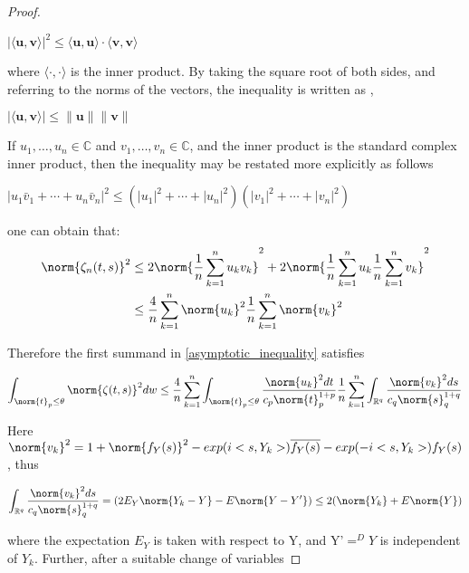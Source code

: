 \begin{proof}
\begin{prop}
$|\langle \mathbf {u} ,\mathbf {v} \rangle |^{2}\leq \langle \mathbf {u} ,\mathbf {u} \rangle \cdot \langle \mathbf {v} ,\mathbf {v} \rangle $

where $ \langle \cdot ,\cdot \rangle $ is the inner product. By taking the square root of both sides, and referring to the norms of the vectors, the inequality is written as \cite{C-S-B_inequality1}, \cite{C-S-B_inequality2}

$ |\langle \mathbf {u} ,\mathbf {v} \rangle |\leq \|\mathbf {u} \|\|\mathbf {v} \|$

If $ u_{1},\ldots ,u_{n}\in \mathbb {C} $ and $ v_{1},\ldots ,v_{n}\in \mathbb {C} $, and the inner product is the standard complex inner product, then the inequality may be restated more explicitly as follows 

$ |u_{1}{\bar {v}}_{1}+\cdots +u_{n}{\bar {v}}_{n}|^{2}\leq (|u_{1}|^{2}+\cdots +|u_{n}|^{2})(|v_{1}|^{2}+\cdots +|v_{n}|^{2})$

\end{prop} 

one can obtain that:
\begin{equation}{}
\begin{split}
\norm{\zeta_{n}(t,s)}^{2}&
\leq 2 \norm{\frac{1}{n}\sum_{k=1}^{n}u_{k}v_{k}}^{2} + 2\norm{\frac{1}{n}\sum_{k=1}^{n}u_{k}\frac{1}{n}\sum_{k=1}^{n}v_{k}}^{2} \\
&\leq \frac{4}{n}\sum_{k=1}^{n}\norm{u_{k}}^{2}\frac{1}{n}\sum_{k=1}^{n}\norm{v_{k}}^{2}
\end{split}
\end{equation}\label{eq_conaaazo}

Therefore the first summand in \ref{asymptotic_inequality} satisfies

$$
\int_{\norm{t}_{p}\leq\theta}\norm{\zeta(t,s)}^{2}dw \leq \frac{4}{n}\sum_{k=1}^{n}\int_{\norm{t}_{p}\leq\theta} \frac{\norm{u_{k}}^{2}dt}{c_{p}\norm{t}^{1+p}_{p}}\frac{1}{n}\sum_{k=1}^{n}\int_{\mathbb{R}^{q}}\frac{\norm{v_{k}}^{2}ds}{c_{q}\norm{s}^{1+q}_{q}}
$$

Here $\norm{v_{k}}^{2} = 1 + \norm{f_{Y}(s)}^{2}- exp(i<s,Y_{k}>)\overline{f_{Y}(s)} - exp(-i<s,Y_{k}>)f_{Y}(s)$, thus

$$
\int_{\mathbb{R}^{q}}\frac{\norm{v_{k}}^{2}ds}{c_{q}\norm{s}^{1+q}_{q}} = (2E_{Y}\norm{Y_{k}-Y}- E\norm{Y-Y'}) \leq 2(\norm{Y_{k}}+E\norm{Y})
$$

where the expectation $E_{Y}$ is taken with respect to Y, and Y'$=^{D}Y$ is independent of $Y_{k}$. Further, after a suitable change of variables


\end{proof}
